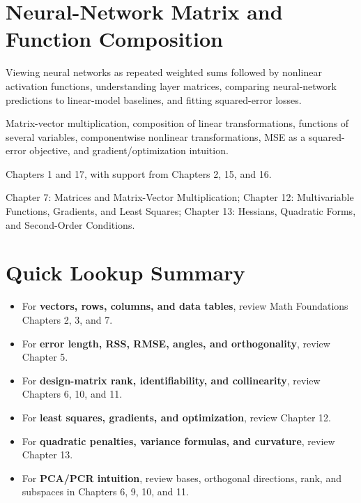 \section{Neural-Network Matrix and Function Composition}
\begin{description}[leftmargin=1.3em,style=nextline,itemsep=0.55em]
  \item[Used in Data Analysis for]
  Viewing neural networks as repeated weighted sums followed by nonlinear activation functions, understanding layer matrices, comparing neural-network predictions to linear-model baselines, and fitting squared-error losses.
  \item[Math Foundations support]
  Matrix-vector multiplication, composition of linear transformations, functions of several variables, componentwise nonlinear transformations, MSE as a squared-error objective, and gradient/optimization intuition.
  \item[Primary Data Analysis chapters]
  Chapters 1 and 17, with support from Chapters 2, 15, and 16.
  \item[Math Foundations reference]
  Chapter 7: Matrices and Matrix-Vector Multiplication; Chapter 12: Multivariable Functions, Gradients, and Least Squares; Chapter 13: Hessians, Quadratic Forms, and Second-Order Conditions.
\end{description}

\section{Quick Lookup Summary}
\begin{itemize}[leftmargin=1.5em,itemsep=0.25em]
  \item For \textbf{vectors, rows, columns, and data tables}, review Math Foundations Chapters 2, 3, and 7.
  \item For \textbf{error length, RSS, RMSE, angles, and orthogonality}, review Chapter 5.
  \item For \textbf{design-matrix rank, identifiability, and collinearity}, review Chapters 6, 10, and 11.
  \item For \textbf{least squares, gradients, and optimization}, review Chapter 12.
  \item For \textbf{quadratic penalties, variance formulas, and curvature}, review Chapter 13.
  \item For \textbf{PCA/PCR intuition}, review bases, orthogonal directions, rank, and subspaces in Chapters 6, 9, 10, and 11.
\end{itemize}

